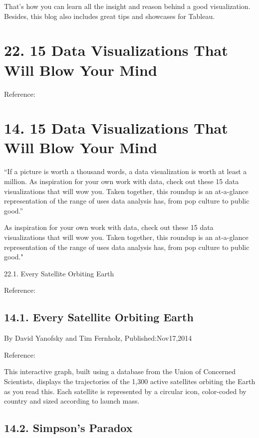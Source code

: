 \documentclass[]{book}
\theoremstyle{definition}
\theoremstyle{definition}
\theoremstyle{definition}
\theoremstyle{remark}
\begin{document}
That's how you can learn all the insight and reason behind a good
visualization. Besides, this blog also includes great tips and showcases
for Tableau.

\section{22. 15 Data Visualizations That Will Blow Your
Mind}\label{data-visualizations-that-will-blow-your-mind}

\citep{15_mindblowing}

Reference: \citep{vizwiz_malaria}

\section{14. 15 Data Visualizations That Will Blow Your
Mind}\label{data-visualizations-that-will-blow-your-mind-1}

``If a picture is worth a thousand words, a data visualization is worth
at least a million. As inspiration for your own work with data, check
out these 15 data visualizations that will wow you. Taken together, this
roundup is an at-a-glance representation of the range of uses data
analysis has, from pop culture to public good.''

As inspiration for your own work with data, check out these 15 data
visualizations that will wow you. Taken together, this roundup is an
at-a-glance representation of the range of uses data analysis has, from
pop culture to public good."

22.1. Every Satellite Orbiting Earth \citep{Satellite}

Reference: \citep{15_mindblowing}

\subsection{14.1. Every Satellite Orbiting
Earth}\label{every-satellite-orbiting-earth}

By David Yanofsky and Tim Fernholz, Published:Nov17,2014

Reference: \citep{Satellite}

This interactive graph, built using a database from the Union of
Concerned Scientists, displays the trajectories of the 1,300 active
satellites orbiting the Earth as you read this. Each satellite is
represented by a circular icon, color-coded by country and sized
according to launch mass.

\subsection{14.2. Simpson's Paradox}\label{simpsons-paradox}
\end{document}
